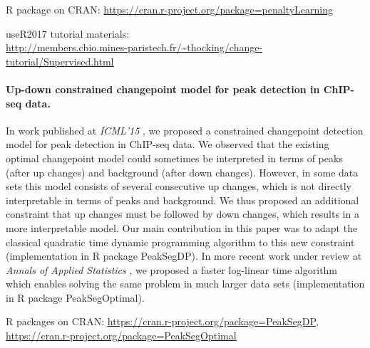\documentclass{article}
\begin{document}
R package on CRAN: \url{https://cran.r-project.org/package=penaltyLearning}

useR2017 tutorial materials:\\ \url{http://members.cbio.mines-paristech.fr/~thocking/change-tutorial/Supervised.html}

\paragraph{Up-down constrained changepoint model for peak detection in
  ChIP-seq data.}
In work published at \emph{ICML'15} \citep{HOCKING-PeakSeg}, we
proposed a constrained changepoint detection model for peak detection
in ChIP-seq data. We observed that the existing optimal changepoint
model could sometimes be interpreted in terms of peaks (after up
changes) and background (after down changes). However, in some data
sets this model consists of several consecutive up changes, which is
not directly interpretable in terms of peaks and background. We thus
proposed an additional constraint that up changes must be followed by
down changes, which results in a more interpretable model. Our main
contribution in this paper was to adapt the classical quadratic time
dynamic programming algorithm to this new constraint (implementation
in R package PeakSegDP). In more recent work under review at
\emph{Annals of Applied Statistics}
\citep{Hocking-constrained-changepoint-detection}, we proposed a
faster log-linear time algorithm which enables solving the same
problem in much larger data sets (implementation in R package
PeakSegOptimal).

R packages on CRAN: \url{https://cran.r-project.org/package=PeakSegDP}, \\
\url{https://cran.r-project.org/package=PeakSegOptimal}



\end{document}
